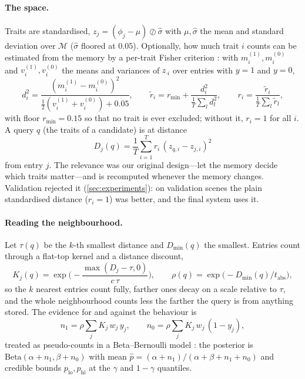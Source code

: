\documentclass[10pt]{article}
\newcommand{\Beta}{\mathrm{Beta}}
\newcommand{\M}{\mathcal{M}}
\begin{document}
\paragraph{The space.} Traits are standardised, $z_j=(\phi_j-\mu)\oslash\hat\sigma$ with $\mu,\hat\sigma$ the mean and standard deviation over $\M$ ($\hat\sigma$ floored at $0.05$). Optionally, how much trait $i$ counts can be estimated from the memory by a per-trait Fisher criterion \citep{fisher1936lda}: with $m^{(1)}_i,m^{(0)}_i$ and $v^{(1)}_i,v^{(0)}_i$ the means and variances of $z_{\cdot i}$ over entries with $y=1$ and $y=0$,
\begin{equation}
d_i^2=\frac{(m^{(1)}_i-m^{(0)}_i)^2}{\tfrac12(v^{(1)}_i+v^{(0)}_i)+0.05},\qquad
\tilde r_i=r_{\min}+\frac{d_i^2}{\frac1T\sum_l d_l^2},\qquad r_i=\frac{\tilde r_i}{\frac1T\sum_l\tilde r_l},
\end{equation}
with floor $r_{\min}=0.15$ so that no trait is ever excluded; without it, $r_i=1$ for all $i$. A query $q$ (the traits of a candidate) is at distance
\begin{equation}
D_j(q)=\frac1T\sum_{i=1}^{T}r_i\,(z_{q,i}-z_{j,i})^2
\end{equation}
from entry $j$. The relevance was our original design---let the memory decide which traits matter---and is recomputed whenever the memory changes. Validation rejected it (\cref{sec:experiments}): on validation scenes the plain standardised distance ($r_i=1$) was better, and the final system uses it.

\paragraph{Reading the neighbourhood.} Let $\tau(q)$ be the $k$-th smallest distance and $D_{\min}(q)$ the smallest. Entries count through a flat-top kernel and a distance discount,
\begin{equation}
K_j(q)=\exp\!\Big(-\frac{\max(D_j-\tau,0)}{c\,\tau}\Big),\qquad \rho(q)=\exp\!\big(-D_{\min}(q)/t_{\mathrm{abs}}\big),
\end{equation}
so the $k$ nearest entries count fully, farther ones decay on a scale relative to $\tau$, and the whole neighbourhood counts less the farther the query is from anything stored. The evidence for and against the behaviour is
\begin{equation}
n_1=\rho\sum_j K_j\,w_j\,y_j,\qquad n_0=\rho\sum_j K_j\,w_j\,(1-y_j),
\end{equation}
treated as pseudo-counts in a Beta--Bernoulli model \citep{gelman2013bda}: the posterior is $\Beta(\alpha+n_1,\beta+n_0)$ with mean $\hat p=(\alpha+n_1)/(\alpha+\beta+n_1+n_0)$ and credible bounds $p_{\mathrm{lo}},p_{\mathrm{hi}}$ at the $\gamma$ and $1-\gamma$ quantiles.
\end{document}
